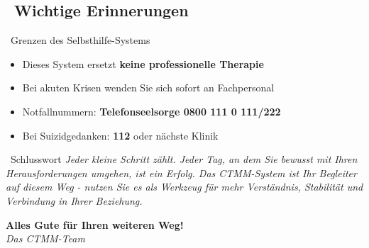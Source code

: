 \documentclass[a4paper,12pt]{article}
\begin{document}
\subsection*{\faLifeRing~Wichtige Erinnerungen}
\begin{ctmmYellowBox}{\faExclamationTriangle~Grenzen des Selbsthilfe-Systems}
\begin{itemize}
    \item Dieses System ersetzt \textbf{keine professionelle Therapie}
    \item Bei akuten Krisen wenden Sie sich sofort an Fachpersonal
    \item Notfallnummern: \textbf{Telefonseelsorge 0800 111 0 111/222}
    \item Bei Suizidgedanken: \textbf{112} oder nächste Klinik
\end{itemize}
\end{ctmmYellowBox}

\vspace{1cm}
\begin{center}
\begin{ctmmBlueBox}{\faHeart~Schlusswort}
\textit{Jeder kleine Schritt zählt. Jeder Tag, an dem Sie bewusst mit Ihren Herausforderungen umgehen, ist ein Erfolg. Das CTMM-System ist Ihr Begleiter auf diesem Weg - nutzen Sie es als Werkzeug für mehr Verständnis, Stabilität und Verbindung in Ihrer Beziehung.}

\vspace{0.5cm}
\textbf{Alles Gute für Ihren weiteren Weg!}\\
\textit{Das CTMM-Team}
\end{ctmmBlueBox}
\end{center}
\end{document}
